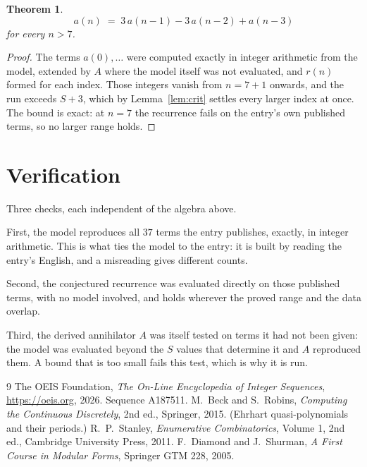\documentclass[11pt,a4paper]{article}
\theoremstyle{plain}
\newtheorem{theorem}{Theorem}
\theoremstyle{definition}
\begin{document}
\begin{theorem}
\[
a(n)\;=\;3\,a(n-1) - 3\,a(n-2) + a(n-3)
\]
for every $n>7$.
\end{theorem}

\begin{proof}
The terms $a(0),\dots$ were computed exactly in integer arithmetic from the model, extended by
$A$ where the model itself was not evaluated, and $r(n)$ formed for each index. Those integers
vanish from $n=7+1$ onwards, and the run exceeds $S+3$, which by
Lemma~\ref{lem:crit} settles every larger index at once. The bound is exact: at $n=7$ the recurrence fails on the entry's own published terms, so no larger range holds.
\end{proof}

\section{Verification}

Three checks, each independent of the algebra above.

First, the model reproduces all $37$ terms the entry publishes, exactly, in integer
arithmetic. This is what ties the model to the entry: it is built by reading the entry's
English, and a misreading gives different counts.

Second, the conjectured recurrence was evaluated directly on those published terms, with no
model involved, and holds wherever the proved range and the data overlap.

Third, the derived annihilator $A$ was itself tested on terms it had not been given: the model
was evaluated beyond the $S$ values that determine it and $A$ reproduced them. A bound that is
too small fails this test, which is why it is run.

\begin{thebibliography}{9}
 The OEIS Foundation, \emph{The On-Line Encyclopedia of Integer
Sequences}, \url{https://oeis.org}, 2026. Sequence A187511.
 M.~Beck and S.~Robins, \emph{Computing the Continuous Discretely},
2nd ed., Springer, 2015. (Ehrhart quasi-polynomials and their periods.)
 R.~P.~Stanley, \emph{Enumerative Combinatorics}, Volume 1, 2nd ed.,
Cambridge University Press, 2011.
 F.~Diamond and J.~Shurman, \emph{A First Course in Modular Forms},
Springer GTM 228, 2005.
\end{thebibliography}
\end{document}
